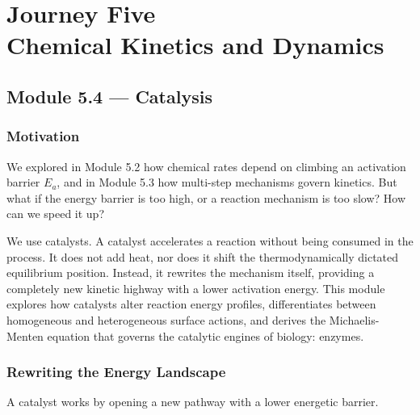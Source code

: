 \documentclass[12pt, a4paper]{book}
\begin{document}
\setcounter{chapter}{4}
\chapter[Journey 5 --- Chemical Kinetics and Dynamics]
        {Journey Five\\[8pt]
         \textcolor{ModuleColor}{\large Chemical Kinetics and Dynamics}}
\setcounter{section}{3}

\section{Module 5.4 --- Catalysis}
\label{sec:mod5.3}

\subsection*{Motivation}

We explored in Module 5.2 how chemical rates depend on climbing an activation barrier $E_a$, and in Module 5.3 how multi-step mechanisms govern kinetics.
But what if the energy barrier is too high, or a reaction mechanism is too slow? How can we speed it up?

We use catalysts.
A catalyst accelerates a reaction without being consumed in the process.
It does not add heat, nor does it shift the thermodynamically dictated equilibrium position.
Instead, it rewrites the mechanism itself, providing a completely new kinetic highway with a lower activation energy.
This module explores how catalysts alter reaction energy profiles, differentiates between homogeneous and heterogeneous surface actions, and derives the Michaelis-Menten equation that governs the catalytic engines of biology: enzymes.

\subsection{Rewriting the Energy Landscape}

A catalyst works by opening a new pathway with a lower energetic barrier.
\end{document}
